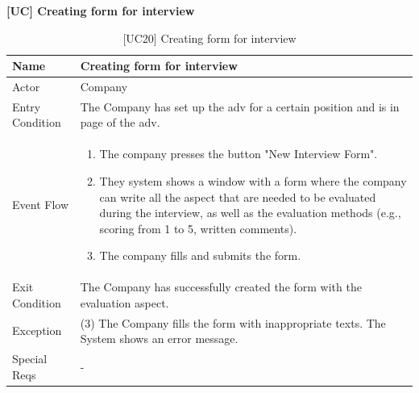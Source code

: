 \textbf{[UC\nextUseCases] Creating form for interview}
\begin{table}[H] %
    \centering
    \begin{tabular}{|p{3cm}|p{10cm}|}
    \hline
    Name & Creating form for interview \\ \hline
    Actor  & Company \\ \hline
    Entry Condition  & The Company has set up the adv for a certain position and is in page of the adv. \\ \hline
    Event Flow  & 
    \begin{enumerate}[noitemsep, topsep=0pt]
        \item The company presses the button "New Interview Form".
        \item They system shows a window with a form where the company can write all the aspect that are needed to be evaluated during the interview, as well as the evaluation methods (e.g., scoring from 1 to 5, written comments).
        \item The company fills and submits the form.
    \end{enumerate}
    \\ \hline
    Exit Condition  & The Company has successfully created the form with the evaluation aspect. \\ \hline
    Exception  & (3) The Company fills the form with inappropriate texts. The System shows an error message.\\ \hline
    Special Reqs  & - \\ \hline
    \end{tabular}
    \caption{[UC20] Creating form for interview}
\end{table}

